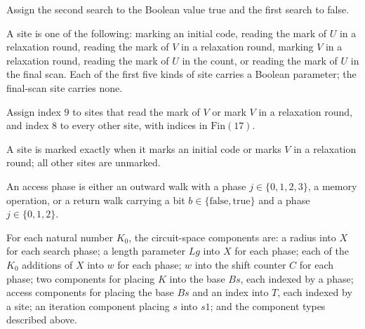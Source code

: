 \begin{definition}
\label{Complexity.LogProg.ExpBFS.toPh}
\leanok
{}
Assign the second search to the Boolean value true and the first search to false.
\end{definition}

\begin{definition}
\label{Complexity.LogProg.ExpBFS.Site}
\leanok
A site is one of the following: marking an initial code, reading the mark of $U$ in a
relaxation round, reading the mark of $V$ in a relaxation round, marking $V$ in a
relaxation round, reading the mark of $U$ in the count, or reading the mark of $U$ in
the final scan. Each of the first five kinds of site carries a Boolean parameter; the
final-scan site carries none.
\end{definition}

\begin{definition}
\label{Complexity.LogProg.ExpBFS.Site.idx}
\leanok
{}
Assign index $9$ to sites that read the mark of $V$ or mark $V$ in a relaxation round,
and index $8$ to every other site, with indices in $\mathrm{Fin}(17)$.
\end{definition}

\begin{definition}
\label{Complexity.LogProg.ExpBFS.Site.set}
\leanok
{}
A site is marked exactly when it marks an initial code or marks $V$ in a relaxation
round; all other sites are unmarked.
\end{definition}

\begin{definition}
\label{Complexity.LogProg.ExpBFS.AcPh}
\leanok
An access phase is either an outward walk with a phase $j\in\{0,1,2,3\}$, a memory
operation, or a return walk carrying a bit $b\in\{\mathrm{false},\mathrm{true}\}$ and a
phase $j\in\{0,1,2\}$.
\end{definition}

\begin{definition}
\label{Complexity.LogProg.ExpBFS.CpS}
\leanok
{}
For each natural number $K_0$, the circuit-space components are: a radius into $X$ for
each search phase; a length parameter $Lg$ into $X$ for each phase; each of the $K_0$
additions of $X$ into $w$ for each phase; $w$ into the shift counter $C$ for each phase;
two components for placing $K$ into the base $Bs$, each indexed by a phase; access
components for placing the base $Bs$ and an index into $T$, each indexed by a site; an
iteration component placing $s$ into $s1$; and the component types described above.
\end{definition}


